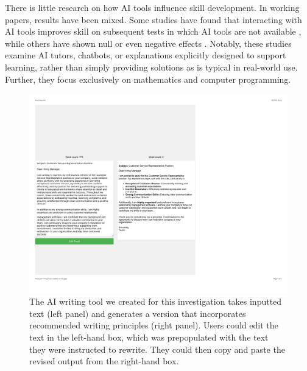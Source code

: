 \documentclass[11pt]{report}
\begin{document}
\begin{mainf}
There is little research on how AI tools influence skill development. 
  In working papers, results have been mixed. 
  Some studies have found that interacting with AI tools improves skill on subsequent tests in which AI tools are not available \cite{kumar2023, lehmann2024ai}, while others have shown null or even negative effects \cite{bastani2024, nie2024gpt,lehmann2024ai}. 
  Notably, these studies examine AI tutors, chatbots, or explanations explicitly designed to support learning, rather than simply providing solutions as is typical in real-world use. 
  Further, they focus exclusively on mathematics and computer programming. 


\begin{figure}[t]
    \centering
    \includegraphics[width=.9\linewidth]{EmailRewriter.pdf}
    \caption{The AI writing tool we created for this investigation takes inputted text (left panel) and generates a version that incorporates recommended writing principles (right panel). Users could edit the text in the left-hand box, which was prepopulated with the text they were instructed to rewrite. They could then copy and paste the revised output from the right-hand box.}
    \label{fig:tool}
\end{figure}


\end{mainf}
\end{document}
